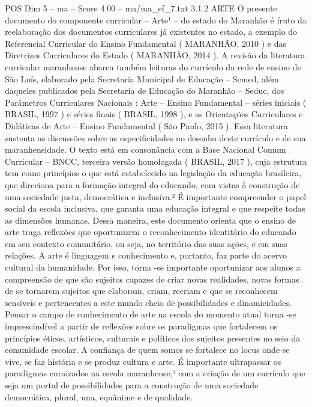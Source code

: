\begin{textsample}{POS Dim 5 – ma – Score 4.00 – ma/ma\_ef\_7.txt}  \label{ex:f5_pos_178}
3.1.2 ARTE O presente documento do componente curricular – Arte¹ – do estado do Maranhão é fruto da reelaboração dos documentos curriculares já existentes no estado, a exemplo do Referencial Curricular do Ensino Fundamental ( MARANHÃO, 2010 ) e das Diretrizes Curriculares do Estado ( MARANHÃO, 2014 ).
A revisão da literatura curricular maranhense abarca também leituras do currículo da rede de ensino de São Luís, elaborado pela Secretaria Municipal de Educação – Semed, além daqueles publicados pela Secretaria de Educação do Maranhão – Seduc, dos Parâmetros Curriculares Nacionais : Arte – Ensino Fundamental – séries iniciais ( BRASIL, 1997 ) e séries finais ( BRASIL, 1998 ), e as Orientações Curriculares e Didáticas de Arte – Ensino Fundamental ( São Paulo, 2015 ).
Essa literatura sustenta as discussões sobre as especificidades no desenho deste currículo e de sua maranhensidade.
O texto está em consonância com a Base Nacional Comum Curricular – BNCC, terceira versão homologada ( BRASIL, 2017 ), cuja estrutura tem como princípios o que está estabelecido na legislação da educação brasileira, que direciona para a formação integral do educando, com vistas à construção de uma sociedade justa, democrática e inclusiva.² É importante compreender o papel social da escola inclusiva, que garanta uma educação integral e que respeite todas as dimensões humanas.
Dessa maneira, este documento orienta que o ensino de arte traga reflexões que oportunizem o reconhecimento identitário do educando em seu contexto comunitário, ou seja, no território das suas ações, e em suas relações.
A arte é linguagem e conhecimento e, portanto, faz parte do acervo cultural da humanidade.
Por isso, torna -se importante oportunizar aos alunos a compreensão de que são sujeitos capazes de criar novas realidades, novas formas de se tornarem sujeitos que elaboram, criam, recriam e que se reconhecem sensíveis e pertencentes a este mundo cheio de possibilidades e dinamicidades.
Pensar o campo de conhecimento de arte na escola do momento atual torna -se imprescindível a partir de reflexões sobre os paradigmas que fortalecem os princípios éticos, artísticos, culturais e políticos dos sujeitos presentes no seio da comunidade escolar.
A confiança de quem somos se fortalece no locus onde se vive, se faz história e se produz cultura e arte.
É importante ultrapassar os paradigmas enraizados na escola maranhense,³ com a criação de um currículo que seja um portal de possibilidades para a construção de uma sociedade democrática, plural, una, equânime e de qualidade.

\end{textsample}
